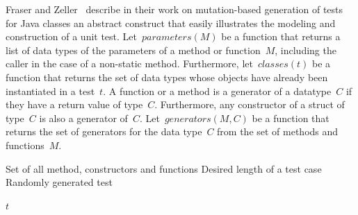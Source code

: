 \documentclass[paper=a4,%
  twoside,%
  BCOR4mm,%
  abstract=true,%
  toc=bibliography,%
  chapterprefix=true,%
  toc=bibliographynumbered,%
  open=right,%
  english,%
  pagesize=pdftex]{scrreprt}
\newcommand{\Desc}[2]{\State \makebox[2em][l]{#1}#2}
\begin{document}
Fraser and Zeller~\cite{Fraser2012} describe in their work on mutation-based generation of tests for Java classes an abstract construct that easily illustrates the modeling and construction of a unit test. Let~$parameters(M)$ be a function that returns a list of data types of the parameters of a method or function~$M$, including the caller in the case of a non-static method. Furthermore, let~$classes(t)$ be a function that returns the set of data types whose objects have already been instantiated in a test~$t$. A function or a method is a generator of a datatype~$C$ if they have a return value of type~$C$. Furthermore, any constructor of a struct of type~$C$ is also a generator of~$C$. Let~$generators(M,C)$ be a function that returns the set of generators for the data type~$C$ from the set of methods and functions~$M$.

\begin{algorithm}[t]
\caption{$GenTest(M, l)$}\label{alg:random-generation-of-a-test}
\begin{algorithmic}
\Input
  \Desc{$M$}{Set of all method, constructors and functions}
  \Desc{$l$}{Desired length of a test case}
\EndInput
\Output
  \Desc{$t$}{Randomly generated test}
\EndOutput
{}


\EndFor
{}

    \EndIf
  \EndFor
\EndWhile
\State \Return $t$
\end{algorithmic}
\end{algorithm}
\end{document}
